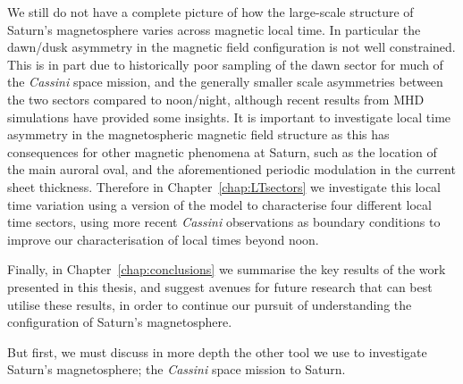 We still do not have a complete picture of how the large-scale structure of Saturn's magnetosphere varies across magnetic local time. In particular the dawn/dusk asymmetry in the magnetic field configuration is not well constrained. This is in part due to historically poor sampling of the dawn sector for much of the \textit{Cassini} space mission, and the generally smaller scale asymmetries between the two sectors compared to noon/night, although recent results from MHD simulations have provided some insights. It is important to investigate local time asymmetry in the magnetospheric magnetic field structure as this has consequences for other magnetic phenomena at Saturn, such as the location of the main auroral oval, and the aforementioned periodic modulation in the current sheet thickness. Therefore in Chapter~\ref{chap:LTsectors} we investigate this local time variation using a version of the \citet{achilleos2010a} model to characterise four different local time sectors, using more recent \textit{Cassini} observations as boundary conditions to improve our characterisation of local times beyond noon.

Finally, in Chapter~\ref{chap:conclusions} we summarise the key results of the work presented in this thesis, and suggest avenues for future research that can best utilise these results, in order to continue our pursuit of understanding the configuration of Saturn's magnetosphere.

But first, we must discuss in more depth the other tool we use to investigate Saturn's magnetosphere; the \textit{Cassini} space mission to Saturn.